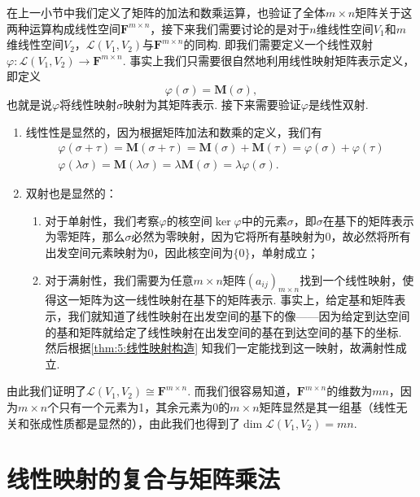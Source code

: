 在上一小节中我们定义了矩阵的加法和数乘运算，也验证了全体$m\times n$矩阵关于这两种运算构成线性空间$\mathbf{F}^{m\times n}$，接下来我们需要讨论的是对于$n$维线性空间$V_1$和$m$维线性空间$V_2$，$\mathcal{L}(V_1,V_2)$与$\mathbf{F}^{m\times n}$的同构. 即我们需要定义一个线性双射$\varphi:\mathcal{L}(V_1,V_2)\to\mathbf{F}^{m\times n}$. 事实上我们只需要很自然地利用线性映射矩阵表示定义，即定义
\[\varphi(\sigma)=\mathbf{M}(\sigma),\]
也就是说$\varphi$将线性映射$\sigma$映射为其矩阵表示. 接下来需要验证$\varphi$是线性双射.
\begin{enumerate}
    \item 线性性是显然的，因为根据矩阵加法和数乘的定义，我们有
          \begin{gather*}
              \varphi(\sigma+\tau)=\mathbf{M}(\sigma+\tau)=\mathbf{M}(\sigma)+\mathbf{M}(\tau)=\varphi(\sigma)+\varphi(\tau) \\
              \varphi(\lambda\sigma)=\mathbf{M}(\lambda\sigma)=\lambda\mathbf{M}(\sigma)=\lambda\varphi(\sigma).
          \end{gather*}

    \item 双射也是显然的：
          \begin{enumerate}
              \item 对于单射性，我们考察$\varphi$的核空间$\ker\varphi$中的元素$\sigma$，即$\sigma$在基下的矩阵表示为零矩阵，那么$\sigma$必然为零映射，因为它将所有基映射为0，故必然将所有出发空间元素映射为0，因此核空间为$\{0\}$，单射成立；

              \item 对于满射性，我们需要为任意$m\times n$矩阵$(a_{ij})_{m\times n}$找到一个线性映射，使得这一矩阵为这一线性映射在基下的矩阵表示. 事实上，给定基和矩阵表示，我们就知道了线性映射在出发空间的基下的像——因为给定到达空间的基和矩阵就给定了线性映射在出发空间的基在到达空间的基下的坐标. 然后根据\autoref{thm:5:线性映射构造} 知我们一定能找到这一映射，故满射性成立.
          \end{enumerate}
\end{enumerate}

由此我们证明了$\mathcal{L}(V_1,V_2)\cong\mathbf{F}^{m\times n}$. 而我们很容易知道，$\mathbf{F}^{m\times n}$的维数为$mn$，因为$m\times n$个只有一个元素为1，其余元素为0的$m\times n$矩阵显然是其一组基（线性无关和张成性质都是显然的），由此我们也得到了$\dim\mathcal{L}(V_1,V_2)=mn$.

\section{线性映射的复合与矩阵乘法}

